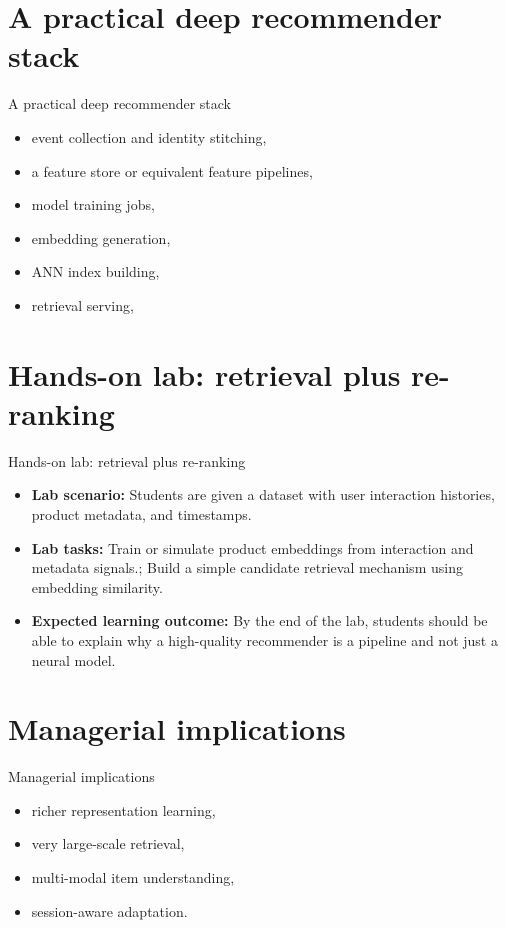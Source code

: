 \documentclass[aspectratio=169]{beamer}
\begin{document}
\section{A practical deep recommender stack}

\begin{frame}{A practical deep recommender stack}
  \begin{itemize}
    \item event collection and identity stitching,
    \item a feature store or equivalent feature pipelines,
    \item model training jobs,
    \item embedding generation,
    \item ANN index building,
    \item retrieval serving,
  \end{itemize}
\end{frame}

\section{Hands-on lab: retrieval plus re-ranking}

\begin{frame}{Hands-on lab: retrieval plus re-ranking}
  \begin{itemize}
    \item \textbf{Lab scenario:} Students are given a dataset with user interaction histories, product metadata, and timestamps.
    \item \textbf{Lab tasks:} Train or simulate product embeddings from interaction and metadata signals.; Build a simple candidate retrieval mechanism using embedding similarity.
    \item \textbf{Expected learning outcome:} By the end of the lab, students should be able to explain why a high-quality recommender is a pipeline and not just a neural model.
  \end{itemize}
\end{frame}

\section{Managerial implications}

\begin{frame}{Managerial implications}
  \begin{itemize}
    \item richer representation learning,
    \item very large-scale retrieval,
    \item multi-modal item understanding,
    \item session-aware adaptation.
  \end{itemize}
\end{frame}
\end{document}
